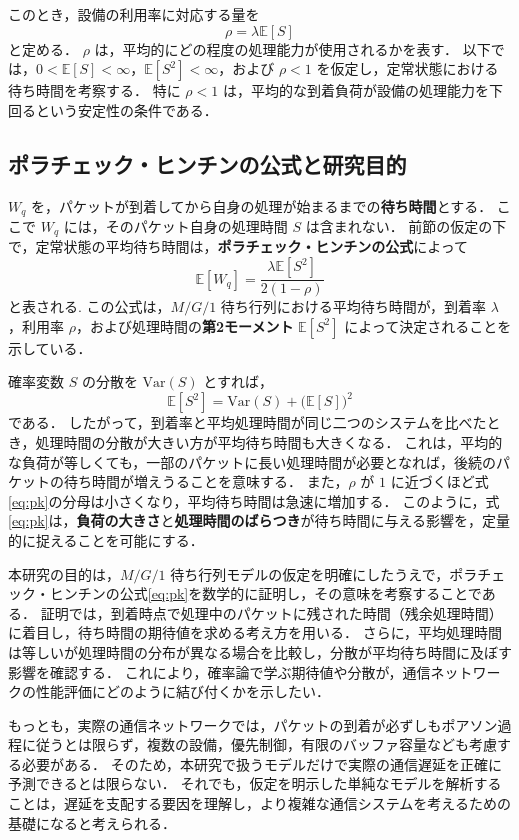 \documentclass[a4paper,11pt]{article}
\begin{document}
このとき，設備の利用率に対応する量を
\begin{equation}
  \rho=\lambda\mathbb{E}[S]
  \label{eq:rho}
\end{equation}
と定める．
$\rho$ は，平均的にどの程度の処理能力が使用されるかを表す．
以下では，$0<\mathbb{E}[S]<\infty$，$\mathbb{E}[S^2]<\infty$，および $\rho<1$ を仮定し，定常状態における待ち時間を考察する．
特に $\rho<1$ は，平均的な到着負荷が設備の処理能力を下回るという安定性の条件である．

\clearpage
\subsection{ポラチェック・ヒンチンの公式と研究目的}
$W_q$ を，パケットが到着してから自身の処理が始まるまでの\textbf{待ち時間}とする．
ここで $W_q$ には，そのパケット自身の処理時間 $S$ は含まれない．
前節の仮定の下で，定常状態の平均待ち時間は，\textbf{ポラチェック・ヒンチンの公式}によって
\begin{equation}
  \boxed{
    \mathbb{E}[W_q]
      =\frac{\lambda\mathbb{E}[S^2]}{2(1-\rho)}
  }
  \label{eq:pk}
\end{equation}
と表される.
この公式は，$M/G/1$ 待ち行列における平均待ち時間が，到着率 $\lambda$，利用率 $\rho$，および処理時間の\textbf{第2モーメント} $\mathbb{E}[S^2]$ によって決定されることを示している．

確率変数 $S$ の分散を $\mathrm{Var}(S)$ とすれば，
\begin{equation}
  \mathbb{E}[S^2]
    =\mathrm{Var}(S)+\bigl(\mathbb{E}[S]\bigr)^2
  \label{eq:secondmoment}
\end{equation}
である．
したがって，到着率と平均処理時間が同じ二つのシステムを比べたとき，処理時間の分散が大きい方が平均待ち時間も大きくなる．
これは，平均的な負荷が等しくても，一部のパケットに長い処理時間が必要となれば，後続のパケットの待ち時間が増えうることを意味する．
また，$\rho$ が $1$ に近づくほど式\eqref{eq:pk}の分母は小さくなり，平均待ち時間は急速に増加する．
このように，式\eqref{eq:pk}は，\textbf{負荷の大きさ}と\textbf{処理時間のばらつき}が待ち時間に与える影響を，定量的に捉えることを可能にする．

本研究の目的は，$M/G/1$ 待ち行列モデルの仮定を明確にしたうえで，ポラチェック・ヒンチンの公式\eqref{eq:pk}を数学的に証明し，その意味を考察することである．
証明では，到着時点で処理中のパケットに残された時間（残余処理時間）に着目し，待ち時間の期待値を求める考え方を用いる．
さらに，平均処理時間は等しいが処理時間の分布が異なる場合を比較し，分散が平均待ち時間に及ぼす影響を確認する．
これにより，確率論で学ぶ期待値や分散が，通信ネットワークの性能評価にどのように結び付くかを示したい．

もっとも，実際の通信ネットワークでは，パケットの到着が必ずしもポアソン過程に従うとは限らず，複数の設備，優先制御，有限のバッファ容量なども考慮する必要がある．
そのため，本研究で扱うモデルだけで実際の通信遅延を正確に予測できるとは限らない．
それでも，仮定を明示した単純なモデルを解析することは，遅延を支配する要因を理解し，より複雑な通信システムを考えるための基礎になると考えられる．
\end{document}
